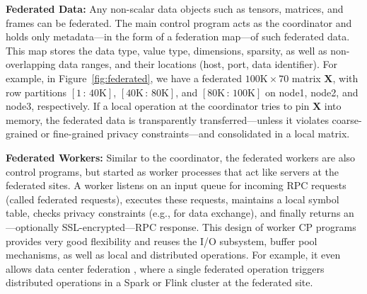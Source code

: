 \documentclass[sigconf,screen]{acmart}
\newcommand{\mat}[1]{\ensuremath{\mathbf{#1}}}
\begin{document}
\textbf{Federated Data:} Any non-scalar data objects such as tensors, matrices, and frames can be federated. The main control program acts as the coordinator and holds only metadata---in the form of a federation map---of such federated data. This map stores the data type, value type, dimensions,  sparsity, as well as non-overlapping data ranges, and their locations (host, port, data identifier). For example, in Figure~\ref{fig:federated}, we have a federated $100\text{K} \times 70$ matrix $\mat{X}$, with row partitions $[1{\,:\,}\text{40K}]$, $[\text{40K}{\,:\,}\text{80K}]$, and $[\text{80K}{\,:\,}\text{100K}]$ on node1, node2, and node3, respectively. If a local operation at the coordinator tries to pin $\mat{X}$ into memory, the federated data is transparently transferred---unless it violates coarse-grained or fine-grained privacy constraints---and consolidated in a local matrix.

\textbf{Federated Workers:} Similar to the coordinator, the federated workers are also control programs, but started as worker processes that act like servers at the federated sites. A worker listens on an input queue for incoming RPC requests (called federated requests), executes these requests, maintains a local symbol table, checks privacy constraints (e.g., for data exchange), and finally returns an---optionally SSL-encrypted---RPC response. This design of worker CP programs provides very good flexibility and reuses the I/O subsystem, buffer pool mechanisms, as well as local and distributed operations. For example, it even allows data center federation \cite{VulimiriCGKV15}, where a single federated operation triggers distributed operations in a Spark \cite{ZahariaCDDMMFSS12} or Flink \cite{AlexandrovBEFHHKLLMNPRSSHTW14} cluster at the federated site.
\end{document}
